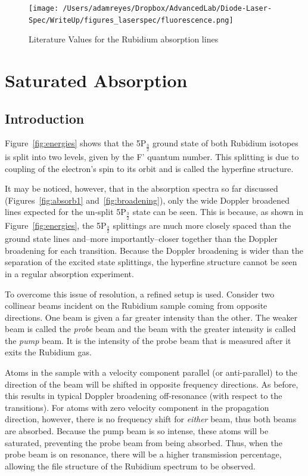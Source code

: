 \documentclass[paper=a4, fontsize=11pt]{scrartcl} %
\numberwithin{equation}{section}
\numberwithin{figure}{section}
\numberwithin{table}{section}
\begin{document}
\clearpage
\begin{figure}[h]
  \centering
  \texttt{[image: /Users/adamreyes/Dropbox/AdvancedLab/Diode-Laser-Spec/WriteUp/figures\_laserspec/fluorescence.png]}
  \caption{Literature Values for the Rubidium absorption lines\cite{vanier}\cite{harvard}}
  \label{fig:literature}
\end{figure}



\section{Saturated Absorption}

\subsection{Introduction}
\label{sec:satabintro}
Figure~\ref{fig:energies} shows that the 5P$_{\frac{3}{2}}$
ground state of both Rubidium isotopes is split into two levels, given by the F' quantum
number. This splitting is due to coupling of the electron's spin to
its orbit and is called the hyperfine structure. 

It may be noticed, however, that in the absorption spectra so far discussed
(Figures~\ref{fig:absorb1} and~\ref{fig:broadening}), only
the wide Doppler broadened lines expected for the un-split
5P$_{\frac{3}{2}}$ state can be seen. This is because, as shown in Figure~\ref{fig:energies}, the 5P$_{\frac{3}{2}}$ splittings are much
more closely spaced than the ground state lines and--more importantly--closer together than the Doppler broadening for each
transition. Because the Doppler broadening is wider than the
separation of the excited state splittings, the hyperfine structure cannot be seen in a
regular absorption experiment.

To overcome this issue of resolution, a refined setup is used. Consider two collinear beams incident on the
Rubidium sample coming from opposite directions. One beam is given a far greater intensity than the other. The weaker
beam is called the \emph{probe} beam and the beam with the greater intensity is called the \emph{pump} beam. It is the intensity of the probe beam that is measured after it exits the Rubidium gas.

Atoms in the sample with a velocity component parallel (or anti-parallel) to the direction of the beam will be shifted in opposite frequency directions. As before, this results in typical Doppler broadening off-resonance (with respect to the transitions). For atoms with zero velocity component in the propagation direction, however, there is no frequency shift for \emph{either} beam, thus both beams are absorbed. Because the pump beam is so intense, these atoms will be saturated, preventing the probe beam from being absorbed. Thus, when the probe beam is on resonance, there will be a higher transmission percentage, allowing the file structure of the Rubidium spectrum to be observed.
\end{document}
